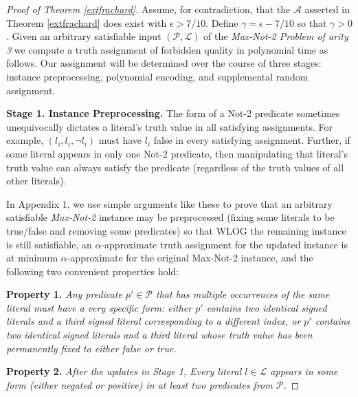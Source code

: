 \documentclass{article}
\newcommand{\ep}[0]{\epsilon}
\begin{document}
\vspace{2mm}
\begin{proof}[Proof of Theorem \ref{extfrachard}] Assume, for  contradiction, that the $\mathcal{A}$ asserted in Theorem \ref{extfrachard} does exist with $\ep>7/10$. Define $\gamma=\ep-7/10$ so that $\gamma>0$. Given an arbitrary satisfiable input $(\mathcal{P}, \mathcal{L})$ of the \textit{Max-Not-2 Problem of arity 3} we compute a truth assignment of forbidden quality in polynomial time as follows. Our assignment will be determined over the course of three stages: instance preprocessing, polynomial encoding, and supplemental random assignment.

\vspace{2mm}

\noindent \textbf{Stage 1. Instance Preprocessing.} The form of a Not-2 predicate sometimes unequivocally dictates a literal's truth value in all satisfying assignments. For example, $(l_i,l_i,\neg l_i)$ must have $l_i$ false in every satisfying assignment. Further, if some literal appears in only one Not-2 predicate, then manipulating that literal's truth value can always satisfy the predicate (regardless of the truth values of all other literals).  

In Appendix 1, we use simple arguments like these to prove that an arbitrary satisfiable \textit{Max-Not-2} instance may be preprocessed (fixing some literals to be true/false and removing some predicates) so that
WLOG the remaining instance is still satisfiable, an $\alpha$-approximate truth assignment for the updated instance is at minimum $\alpha$-approximate for the original Max-Not-2 instance, and the following two convenient properties hold:

\vspace{1mm}

\noindent \textbf{Property 1.} \textit{Any predicate $p'\in \mathcal{P}$ that has multiple occurrences of the same literal must have a very specific form: either $p'$ contains two identical signed literals and a third signed literal corresponding to a different index, or  $p'$ contains two identical signed literals and a third literal whose truth value has been permanently fixed to either false or true.}
\vspace{1mm}


\noindent \textbf{Property 2.} \textit{After the updates in Stage 1, Every literal $l\in \mathcal{L}$ appears in some form (either negated or positive) in at least two predicates from $\mathcal{P}$.}


\end{proof}
\end{document}

